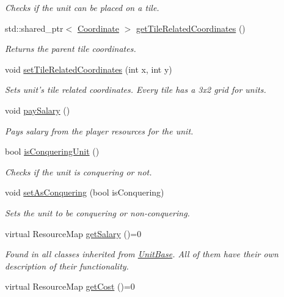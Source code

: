 \begin{DoxyCompactItemize}
\begin{DoxyCompactList}\small\item\em Checks if the unit can be placed on a tile. \end{DoxyCompactList}\item 
std\-::shared\-\_\-ptr$<$ \hyperlink{class_course_1_1_coordinate}{Coordinate} $>$ \hyperlink{class_course_1_1_unit_base_a25ba49373b6d868b1f13d5ee75e7d684}{get\-Tile\-Related\-Coordinates} ()
\begin{DoxyCompactList}\small\item\em Returns the parent tile coordinates. \end{DoxyCompactList}\item 
void \hyperlink{class_course_1_1_unit_base_a1d5ad7e6450b9a2d70c944b7457ac95b}{set\-Tile\-Related\-Coordinates} (int x, int y)
\begin{DoxyCompactList}\small\item\em Sets unit's tile related coordinates. Every tile has a 3x2 grid for units. \end{DoxyCompactList}\item 
void \hyperlink{class_course_1_1_unit_base_a7c23bef1720d0eb40829b42ede6a819f}{pay\-Salary} ()
\begin{DoxyCompactList}\small\item\em Pays salary from the player resources for the unit. \end{DoxyCompactList}\item 
bool \hyperlink{class_course_1_1_unit_base_ae23a0a75e158eb0dfd2947101abe5cac}{is\-Conquering\-Unit} ()
\begin{DoxyCompactList}\small\item\em Checks if the unit is conquering or not. \end{DoxyCompactList}\item 
void \hyperlink{class_course_1_1_unit_base_a81a979e2566a1f55b38db00e3199e54c}{set\-As\-Conquering} (bool is\-Conquering)
\begin{DoxyCompactList}\small\item\em Sets the unit to be conquering or non-\/conquering. \end{DoxyCompactList}\item 
\hypertarget{class_course_1_1_unit_base_a960002e7202707497581135df3c56172}{virtual Resource\-Map \hyperlink{class_course_1_1_unit_base_a960002e7202707497581135df3c56172}{get\-Salary} ()=0}\label{class_course_1_1_unit_base_a960002e7202707497581135df3c56172}

\begin{DoxyCompactList}\small\item\em Found in all classes inherited from \hyperlink{class_course_1_1_unit_base}{Unit\-Base}. All of them have their own description of their functionality. \end{DoxyCompactList}\item 
\hypertarget{class_course_1_1_unit_base_ab02cc752895ebbdd633554686a04f0e8}{virtual Resource\-Map \hyperlink{class_course_1_1_unit_base_ab02cc752895ebbdd633554686a04f0e8}{get\-Cost} ()=0}\label{class_course_1_1_unit_base_ab02cc752895ebbdd633554686a04f0e8}


\end{DoxyCompactItemize}
